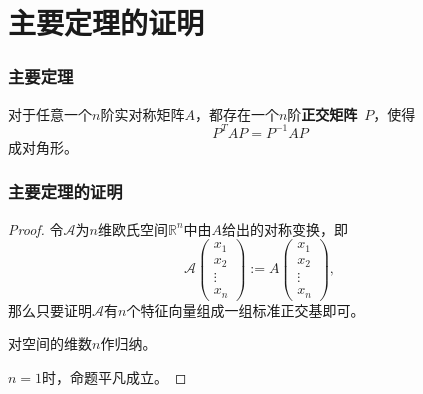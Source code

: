 
\section{主要定理的证明}


\begin{frame}
\frametitle{主要定理}

\begin{thm}
对于任意一个$n$阶实对称矩阵$A$，都存在一个$n$阶{\bfseries 正交矩阵}~$P$，使得
$$P^TAP = P^{-1}AP$$
成对角形。
\end{thm}

\end{frame}


\begin{frame}
\frametitle{主要定理的证明}

\begin{proof}
\phantom{一一}令$\mathscr{A}$为$n$维欧氏空间$\mathbb{R}^n$中由$A$给出的对称变换，即
$$\mathscr{A} \begin{pmatrix} x_1 \\ x_2 \\ \vdots \\ x_n \end{pmatrix} := A \begin{pmatrix} x_1 \\ x_2 \\ \vdots \\ x_n \end{pmatrix},$$
那么只要证明$\mathscr{A}$有$n$个特征向量组成一组标准正交基即可。

\pause

\vspace{0.6em}

\phantom{一一}对空间的维数$n$作归纳。

\vspace{0.6em}

\phantom{一一}$n=1$时，命题平凡成立。
\renewcommand{\qedsymbol}{}
\end{proof}

\end{frame}


